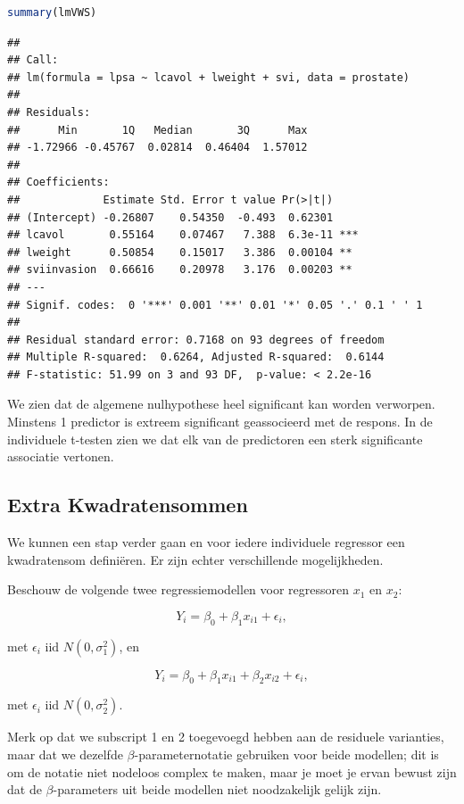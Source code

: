 \documentclass[
  12pt,dutch,coursenotes]{book}
\theoremstyle{definition}
\theoremstyle{definition}
\theoremstyle{definition}
\theoremstyle{definition}
\theoremstyle{remark}
\begin{document}
\begin{lstlisting}[language=R]
summary(lmVWS)
\end{lstlisting}

\begin{lstlisting}
## 
## Call:
## lm(formula = lpsa ~ lcavol + lweight + svi, data = prostate)
## 
## Residuals:
##      Min       1Q   Median       3Q      Max 
## -1.72966 -0.45767  0.02814  0.46404  1.57012 
## 
## Coefficients:
##             Estimate Std. Error t value Pr(>|t|)    
## (Intercept) -0.26807    0.54350  -0.493  0.62301    
## lcavol       0.55164    0.07467   7.388  6.3e-11 ***
## lweight      0.50854    0.15017   3.386  0.00104 ** 
## sviinvasion  0.66616    0.20978   3.176  0.00203 ** 
## ---
## Signif. codes:  0 '***' 0.001 '**' 0.01 '*' 0.05 '.' 0.1 ' ' 1
## 
## Residual standard error: 0.7168 on 93 degrees of freedom
## Multiple R-squared:  0.6264, Adjusted R-squared:  0.6144 
## F-statistic: 51.99 on 3 and 93 DF,  p-value: < 2.2e-16
\end{lstlisting}

We zien dat de algemene nulhypothese heel significant kan worden verworpen. Minstens 1 predictor is extreem significant geassocieerd met de respons. In de individuele t-testen zien we dat elk van de predictoren een sterk significante associatie vertonen.

\hypertarget{extra-kwadratensommen}{%
\subsection{Extra Kwadratensommen}\label{extra-kwadratensommen}}

We kunnen een stap verder gaan en voor iedere individuele regressor een kwadratensom definiëren. Er zijn echter verschillende mogelijkheden.

Beschouw de volgende twee regressiemodellen voor regressoren \(x_1\) en \(x_2\):

\[
  Y_i = \beta_0+\beta_1 x_{i1} + \epsilon_i,
\]

met \(\epsilon_i\text{ iid } N(0,\sigma_1^{2})\), en

\[
Y_i = \beta_0+\beta_1 x_{i1}+\beta_2 x_{i2} + \epsilon_i,
\]

met \(\epsilon_i\text{ iid } N(0,\sigma_2^{2})\).

Merk op dat we subscript 1 en 2 toegevoegd hebben aan de residuele varianties, maar dat we dezelfde \(\beta\)-parameternotatie gebruiken voor beide modellen; dit is om de notatie niet nodeloos complex te maken, maar je moet je ervan bewust zijn dat de \(\beta\)-parameters uit beide modellen niet noodzakelijk gelijk zijn.
\end{document}
